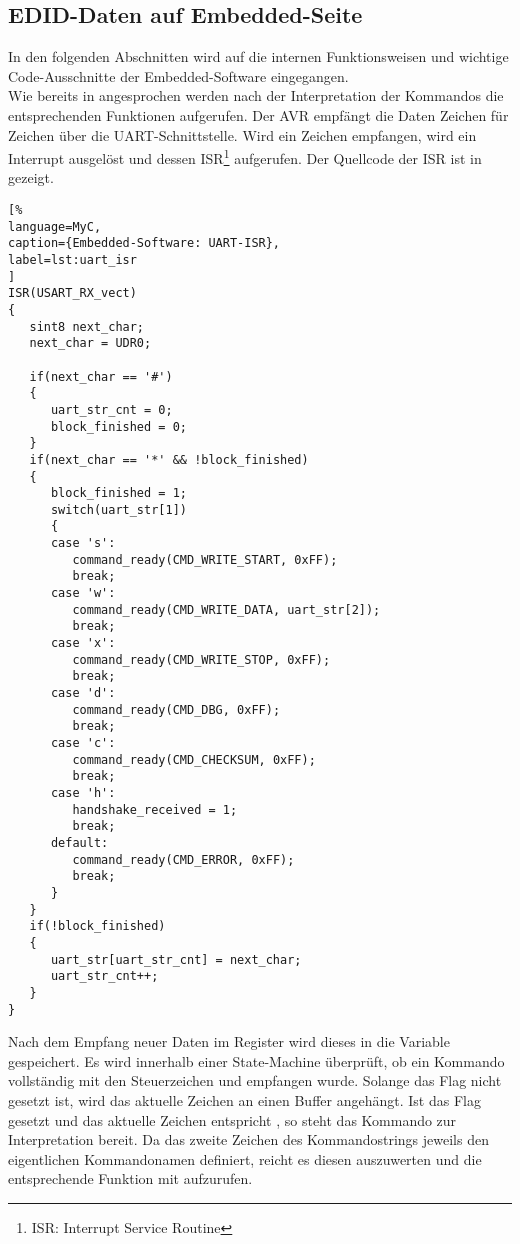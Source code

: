 \subsection{EDID-Daten auf Embedded-Seite}
In den folgenden Abschnitten wird auf die  internen Funktionsweisen und wichtige Code-Ausschnitte der Embedded-Software eingegangen.\\
Wie bereits in  angesprochen werden nach der Interpretation der Kommandos die entsprechenden Funktionen aufgerufen. Der AVR empfängt die Daten Zeichen für Zeichen über die UART-Schnittstelle. Wird ein Zeichen empfangen, wird ein Interrupt ausgelöst und dessen ISR\footnote{ISR: Interrupt Service Routine} aufgerufen. Der Quellcode der ISR ist in  gezeigt.
\begin{lstlisting}[%
language=MyC,
caption={Embedded-Software: UART-ISR},
label=lst:uart_isr
]
ISR(USART_RX_vect)
{
   sint8 next_char;
   next_char = UDR0;

   if(next_char == '#')
   {
      uart_str_cnt = 0;
      block_finished = 0;
   }
   if(next_char == '*' && !block_finished)
   {
      block_finished = 1;
      switch(uart_str[1])
      {
      case 's':
         command_ready(CMD_WRITE_START, 0xFF);
         break;
      case 'w':
         command_ready(CMD_WRITE_DATA, uart_str[2]);
         break;
      case 'x':
         command_ready(CMD_WRITE_STOP, 0xFF);
         break;
      case 'd':
         command_ready(CMD_DBG, 0xFF);
         break;
      case 'c':
         command_ready(CMD_CHECKSUM, 0xFF);
         break;
      case 'h':
         handshake_received = 1;
         break;
      default:
         command_ready(CMD_ERROR, 0xFF);
         break;
      }
   }
   if(!block_finished)
   {
      uart_str[uart_str_cnt] = next_char;
      uart_str_cnt++;
   }
}
\end{lstlisting}
Nach dem Empfang neuer Daten im Register  wird dieses in die Variable  gespeichert. Es wird innerhalb einer State-Machine überprüft, ob ein Kommando vollständig mit den Steuerzeichen \code{\#} und \code{\*} empfangen wurde. Solange das Flag  nicht gesetzt ist, wird das aktuelle Zeichen an einen Buffer  angehängt. Ist das Flag  gesetzt und das aktuelle Zeichen entspricht \code{\*}, so steht das Kommando zur Interpretation bereit. Da das zweite Zeichen des Kommandostrings  jeweils den eigentlichen Kommandonamen definiert, reicht es diesen auszuwerten und die entsprechende Funktion mit  aufzurufen.
